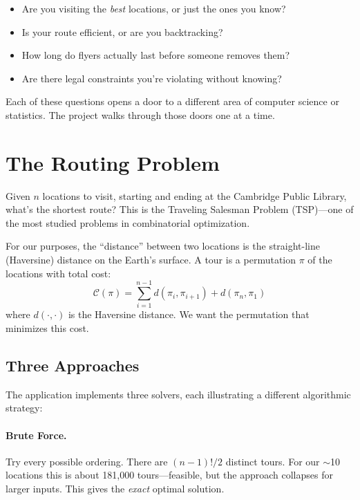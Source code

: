 \documentclass[sigconf,nonacm]{acmart}
\begin{document}
\begin{itemize}
    \item Are you visiting the \emph{best} locations, or just the ones you know?
    \item Is your route efficient, or are you backtracking?
    \item How long do flyers actually last before someone removes them?
    \item Are there legal constraints you're violating without knowing?
\end{itemize}

Each of these questions opens a door to a different area of computer science or statistics. The project walks through those doors one at a time.

\section{The Routing Problem}

Given $n$ locations to visit, starting and ending at the Cambridge Public Library, what's the shortest route? This is the Traveling Salesman Problem (TSP)---one of the most studied problems in combinatorial optimization.

For our purposes, the ``distance'' between two locations is the straight-line (Haversine) distance on the Earth's surface. A tour is a permutation $\pi$ of the locations with total cost:
\begin{equation}
    \mathcal{C}(\pi) = \sum_{i=1}^{n-1} d(\pi_i, \pi_{i+1}) + d(\pi_n, \pi_1)
\end{equation}
where $d(\cdot, \cdot)$ is the Haversine distance. We want the permutation that minimizes this cost.

\subsection{Three Approaches}

The application implements three solvers, each illustrating a different algorithmic strategy:

\paragraph{Brute Force.} Try every possible ordering. There are $(n-1)!/2$ distinct tours. For our $\sim$10 locations this is about 181,000 tours---feasible, but the approach collapses for larger inputs. This gives the \emph{exact} optimal solution.
\end{document}
